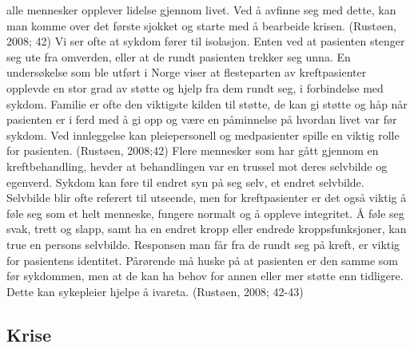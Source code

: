 alle mennesker opplever lidelse gjennom livet. Ved å avfinne seg med dette, kan
man komme over det første sjokket og starte med å bearbeide krisen. (Rustøen,
2008; 42) Vi ser ofte at sykdom fører til isolasjon. Enten ved at pasienten
stenger seg ute fra omverden, eller at de rundt pasienten trekker seg unna. En
undersøkelse som ble utført i Norge viser at flesteparten av kreftpasienter
opplevde en stor grad av støtte og hjelp fra dem rundt seg, i forbindelse med
sykdom. Familie er ofte den viktigste kilden til støtte, de kan gi støtte og
håp når pasienten er i ferd med å gi opp og være en påminnelse på hvordan livet
var før sykdom. Ved innleggelse kan pleiepersonell og medpasienter spille en
viktig rolle for pasienten. (Rustøen, 2008;42) Flere mennesker som har gått
gjennom en kreftbehandling, hevder at behandlingen var en trussel mot deres
selvbilde og egenverd. Sykdom kan føre til endret syn på seg selv, et endret
selvbilde. Selvbilde blir ofte referert til utseende, men for kreftpasienter er
det også viktig å føle seg som et helt menneske, fungere normalt og å oppleve
integritet. Å føle seg svak, trett og slapp, samt ha en endret kropp eller
endrede kroppsfunksjoner, kan true en persons selvbilde. Responsen man får fra
de rundt seg på kreft, er viktig for pasientens identitet. Pårørende må huske
på at pasienten er den samme som før sykdommen, men at de kan ha behov for
annen eller mer støtte enn tidligere. Dette kan sykepleier hjelpe å ivareta.
(Rustøen, 2008; 42-43)

\subsection{Krise}

